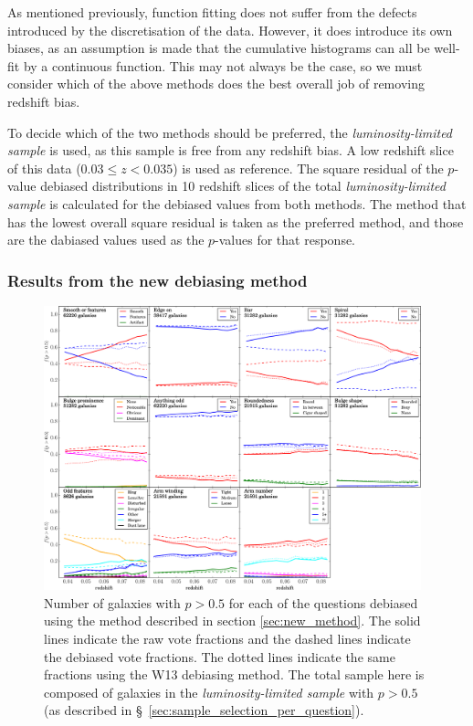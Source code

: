 \documentclass[useAMS,usenatbib]{mn2e}
\begin{document}
As mentioned previously, function fitting does not suffer from the defects introduced by the discretisation of the data. However, it does introduce its own biases, as an assumption is made that the cumulative histograms can all be well-fit by a continuous function. This may not always be the case, so we must consider which of the above methods does the best overall job of removing redshift bias. 

To decide which of the two methods should be preferred, the \textit{luminosity-limited sample} is used, as this sample is free from any redshift bias. A low redshift slice of this data ($0.03 \leq z < 0.035$) is used as reference. The square residual of the $p$-value debiased distributions in 10 redshift slices of the total \textit{luminosity-limited sample} is calculated for the debiased values from both methods. The method that has the lowest overall square residual is taken as the preferred method, and those are the dabiased values used as the $p$-values for that response.
\subsubsection{Results from the new debiasing method}
\label{sec:debiasing_results}

\begin{figure}
		\centering

        \includegraphics[width=0.975\textwidth]{Images/Bias/Debiasing/all_thresholds.pdf}

        \caption{Number of galaxies with $p>0.5$ for each of the questions debiased using the method described in section \ref{sec:new_method}. The solid lines indicate the raw vote fractions and the dashed lines indicate the debiased vote fractions. The dotted lines indicate the same fractions using the W13 debiasing method. The total sample here is composed of galaxies in the \textit{luminosity-limited sample} with $p>0.5$ (as described in \S~\ref{sec:sample_selection_per_question}).}

        \label{fig:all_thresholds}

\end{figure}
\end{document}
